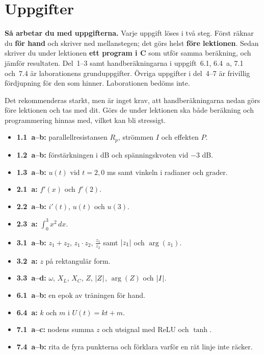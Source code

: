 
\section{Uppgifter}
\label{c18:sec:uppgifter}

\begin{aside}
\textbf{Så arbetar du med uppgifterna.} Varje uppgift löses i två steg. Först räknar du
\textbf{för hand} och skriver ned mellanstegen; det görs helst \textbf{före lektionen}. Sedan skriver
du under lektionen \textbf{ett program i C} som utför samma beräkning, och jämför resultaten.
Del~1--3 samt handberäkningarna i uppgift~6.1, 6.4~a, 7.1 och~7.4 är laborationens grunduppgifter.
Övriga uppgifter i del~4--7 är frivillig fördjupning för den som hinner. Laborationen bedöms inte.

\end{aside}

\begin{aside}
\note[Obs] Det rekommenderas starkt, men är inget krav, att handberäkningarna nedan görs före
lektionen och tas med dit. Görs de under lektionen ska både beräkning och programmering hinnas
med, vilket kan bli stressigt.
\begin{itemize}
  \item \textbf{1.1~a--b:} parallellresistansen $R_p$, strömmen $I$ och effekten $P$.
  \item \textbf{1.2~a--b:} förstärkningen i dB och spänningskvoten vid $-3$ dB.
  \item \textbf{1.3~a--b:} $u(t)$ vid $t = 2{,}0$ ms samt vinkeln i radianer och grader.
  \item \textbf{2.1~a:} $f'(x)$ och $f'(2)$.
  \item \textbf{2.2~a--b:} $i'(t)$, $u(t)$ och $u(3)$.
  \item \textbf{2.3~a:} $\int_0^3 x^2\,dx$.
  \item \textbf{3.1~a--b:} $z_1 + z_2$, $z_1 \cdot z_2$, $\frac{z_1}{z_2}$ samt $\lvert z_1\rvert$ och $\arg(z_1)$.
  \item \textbf{3.2~a:} $z$ på rektangulär form.
  \item \textbf{3.3~a--d:} $\omega$, $X_L$, $X_C$, $Z$, $\lvert Z\rvert$, $\arg(Z)$ och $\lvert I\rvert$.
  \item \textbf{6.1~a--b:} en epok av träningen för hand.
  \item \textbf{6.4~a:} $k$ och $m$ i $U(t) = kt + m$.
  \item \textbf{7.1~a--c:} nodens summa $z$ och utsignal med ReLU och $\tanh$.
  \item \textbf{7.4~a--b:} rita de fyra punkterna och förklara varför en rät linje inte räcker.
\end{itemize}
\end{aside}

